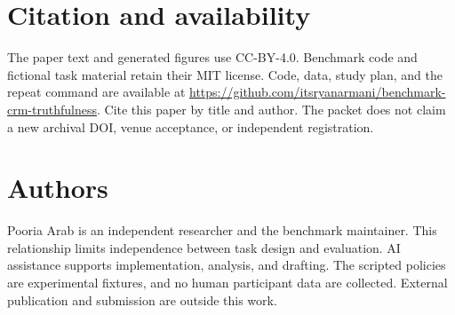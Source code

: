 \documentclass{article}
\begin{document}
\section{Citation and availability}
The paper text and generated figures use CC-BY-4.0. Benchmark code and fictional task material retain their MIT license. Code, data, study plan, and the repeat command are available at \url{https://github.com/itsryanarmani/benchmark-crm-truthfulness}. Cite this paper by title and author. The packet does not claim a new archival DOI, venue acceptance, or independent registration.\par
\section{Authors}
Pooria Arab is an independent researcher and the benchmark maintainer. This relationship limits independence between task design and evaluation. AI assistance supports implementation, analysis, and drafting. The scripted policies are experimental fixtures, and no human participant data are collected. External publication and submission are outside this work.\par

\end{document}

